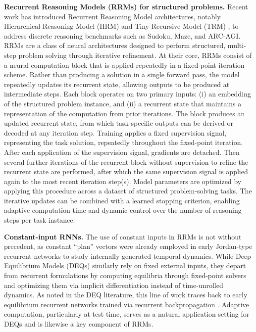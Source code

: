 \documentclass{article}
\theoremstyle{plain}
\theoremstyle{definition}
\theoremstyle{remark}
\renewcommand{\paragraph}[1]{\textbf{#1}\;}
\begin{document}
\paragraph{Recurrent Reasoning Models (RRMs) for structured problems.}
Recent work has introduced Recurrent Reasoning Model architectures, notably 
Hierarchical Reasoning Model (HRM) \citep{wang2025hierarchical} 
and Tiny Recursive Model (TRM) \citep{jolicoeur2025less}, 
to address discrete reasoning benchmarks such as Sudoku, Maze, and ARC-AGI.
RRMs are a class of neural architectures designed to perform structured, 
multi-step problem solving through iterative refinement. 
At their core, RRMs consist of a neural computation block that is applied repeatedly
in a fixed-point iteration scheme. Rather than producing a solution in a single forward pass, 
the model repeatedly updates its recurrent state, 
allowing outputs to be produced at intermediate steps.
Each block operates on two primary inputs: 
(i) an embedding of the structured problem instance, and 
(ii) a recurrent state that maintains a representation 
of the computation from prior iterations. 
The block produces an updated recurrent state, 
from which task-specific outputs can be derived or decoded at any iteration step.
Training applies a fixed supervision signal, representing the task solution, 
repeatedly throughout the fixed-point iteration. 
After each application of the supervision signal, gradients are detached. 
Then several further iterations of the recurrent block without supervision to refine the recurrent state are performed,
after which the same supervision signal is applied again to the most recent iteration step(s). 
Model parameters are optimized by applying this procedure across a dataset 
of structured problem-solving tasks. 
The iterative updates can be combined with a learned stopping criterion, 
enabling adaptive computation time and dynamic control over the number of reasoning steps per task instance.


\paragraph{Constant-input RNNs.} 
The use of constant inputs in RRMs is not without precedent, 
as constant “plan” vectors were already employed in early 
Jordan-type recurrent networks \citep{jordan1986parallel} to study internally generated temporal dynamics. 
While Deep Equilibrium Models (DEQs) \citep{bai2019deep} similarly rely on fixed external inputs, 
they depart from recurrent formulations by computing equilibria 
through fixed-point solvers and optimizing them via implicit differentiation instead of time-unrolled dynamics. 
As noted in the DEQ literature, this line of work traces back to early equilibrium recurrent networks 
trained via recurrent backpropagation \citep{almeida1987learning,pineda1987generalization,schmidhuber2015deep}. 
Adaptive computation, particularly at test time, serves as a 
natural application setting for DEQs and is likewise a key component of RRMs.
\end{document}
